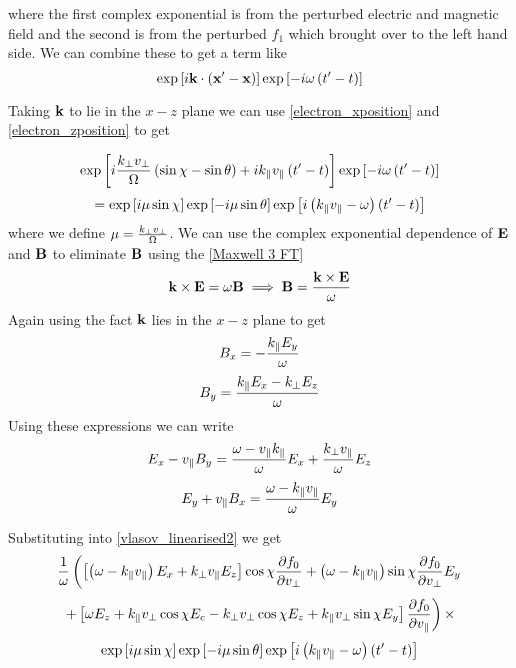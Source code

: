 where the first complex exponential is from the perturbed electric and magnetic field and the second is from the perturbed $f_1$ which brought over to the left hand side. We can combine these to get a term like
\begin{equation}
	\exp \left[i\textbf{k}\cdot \left(\textbf{x}' -\textbf{x} \right)\right] \exp \left[-i\omega \left(t' - t\right)\right]
\end{equation}

Taking $\textbf{k}$ to lie in the $x-z$ plane we can use \eqref{electron_xposition} and \eqref{electron_zposition} to get

\begin{equation*}
	\exp \left[i\frac{k_\perp v_\perp}{\Omega} \left(\sin\chi- \sin\theta\right) +ik_\parallel v_\parallel \left(t' - t\right)\right] \exp \left[-i\omega \left(t' - t\right)\right]
\end{equation*}
\begin{equation}
	= \exp \left[i\mu \sin\chi \right] \exp \left[-i\mu \sin\theta \right] \exp \left[i\left(k_\parallel v_\parallel - \omega\right) \left(t' - t\right)\right]
\end{equation}
where we define $\mu = \frac{k_\perp v_\perp}{\Omega}$. We can use the complex exponential dependence of $\textbf{E}$ and $\textbf{B}$ to eliminate $\textbf{B}$ using the \eqref{Maxwell 3 FT}
\begin{equation}
	\textbf{k} \times \textbf{E} = \omega \textbf{B} \implies \textbf{B} = \frac{\textbf{k} \times \textbf{E}}{\omega}
\end{equation}
Again using the fact $\textbf{k}$ lies in the $x-z$ plane to get
\begin{equation}
	B_x = -\frac{k_\parallel E_y}{\omega}
\end{equation}
\begin{equation}
	B_y = \frac{k_\parallel E_x - k_\perp E_z}{\omega}
\end{equation}
Using these expressions we can write
\begin{equation}
	E_x - v_\parallel B_y = \frac{\omega - v_\parallel k_\parallel}{\omega}E_x + \frac{k_\perp v_\parallel}{\omega}E_z
\end{equation}
\begin{equation}
	E_y + v_\parallel B_x = \frac{\omega - k_\parallel v_\parallel}{\omega}E_y
\end{equation}

Substituting into \eqref{vlasov_linearised2} we get
\begin{equation*}
	\frac{1}{\omega} \left( \left[ \left(\omega-k_\parallel v_\parallel\right)E_x + k_\perp v_\parallel E_z \right]\cos\chi \frac{\partial f_0}{\partial v_\perp} + \left(\omega-k_\parallel v_\parallel\right)\sin\chi \frac{\partial f_0}{\partial v_\perp} E_y \right.
\end{equation*}
\begin{equation*}
	\left. + \left[ \omega E_z + k_\parallel v_\perp\cos\chi E_c - k_\perp v_\perp\cos\chi E_z + k_\parallel v_\perp\sin\chi E_y \right] \frac{\partial f_0}{\partial v_\parallel} \right) \times
\end{equation*}
\begin{equation}
	\exp \left[i\mu \sin\chi \right] \exp \left[-i\mu \sin\theta \right] \exp \left[i\left(k_\parallel v_\parallel - \omega\right) \left(t' - t\right)\right]
\end{equation}

